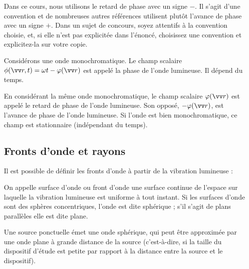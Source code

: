 \documentclass[11pt,fleqn]{book} %
\begin{document}
\begin{remark}
Dans ce cours, nous utilisons le retard de phase avec un signe $-$. Il s'agit d'une convention et de nombreuses autres références utilisent plutôt l'avance de phase avec un signe $+$. Dans un sujet de concours, soyez attentifs à la convention choisie, et, si elle n'est pas explicitée dans l'énoncé, choisissez une convention et explicitez-la sur votre copie.
\end{remark}

\begin{definition}[Phase]
	Considérons une onde monochromatique. Le champ scalaire $\phi(\vv r,t) = \omega t - \varphi(\vv r)$ est appelé la phase de l'onde lumineuse. Il dépend du temps.
\end{definition}
\begin{definition}
	En considérant la même onde monochromatique, le champ scalaire $\varphi(\vv r)$ est appelé le retard de phase de l'onde lumineuse. Son opposé, $-\varphi(\vv r)$, est l'avance de phase de l'onde lumineuse. Si l'onde est bien monochromatique, ce champ est stationnaire (indépendant du temps).
\end{definition}

\subsection{Fronts d'onde et rayons}

Il est possible de définir les fronts d'onde à partir de la vibration lumineuse :
\begin{definition}
On appelle surface d’onde ou front d’onde une surface continue de l’espace sur laquelle la vibration lumineuse est uniforme à tout instant.
Si les surfaces d’onde sont des sphères concentriques, l’onde est dite sphérique ; s’il s’agit de plans parallèles elle est dite plane.
\end{definition}
\begin{proposition}
Une source ponctuelle émet une onde sphérique, qui peut être approximée par une onde plane à grande distance de la source (c'est-à-dire, si la taille du dispositif d'étude est petite par rapport à la distance entre la source et le dispositif).
\end{proposition}
\end{document}
